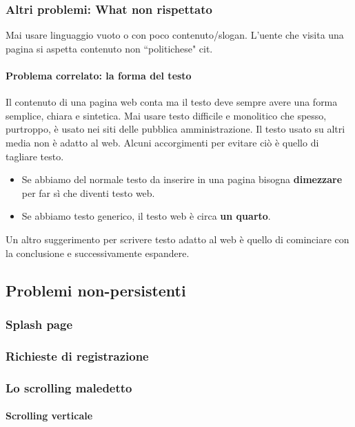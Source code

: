 		\subsubsection{Altri problemi: What non rispettato}
			Mai usare linguaggio vuoto o con poco contenuto/slogan. L'uente che visita una pagina si aspetta contenuto non ``politichese" cit.
			
			\paragraph{Problema correlato: la forma del testo}
				Il contenuto di una pagina web conta ma il testo deve sempre avere una forma semplice, chiara e sintetica. Mai usare testo difficile e monolitico che spesso, purtroppo, è usato nei siti delle pubblica amministrazione. Il testo usato su altri media non è adatto al web. Alcuni accorgimenti per evitare ciò è quello di tagliare testo.
				\begin{itemize}
					\item Se abbiamo del normale testo da inserire in una pagina bisogna \textbf{dimezzare} per far sì che diventi testo web.
					\item Se abbiamo testo generico, il testo web è circa \textbf{un quarto}.
				\end{itemize}
				Un altro suggerimento per scrivere testo adatto al web è quello di cominciare con la conclusione e successivamente espandere.
	
	\subsection{Problemi non-persistenti}
	
		\subsubsection{Splash page}
		
		\subsubsection{Richieste di registrazione}
		
		\subsubsection{Lo scrolling maledetto}
			\paragraph{Scrolling verticale}
